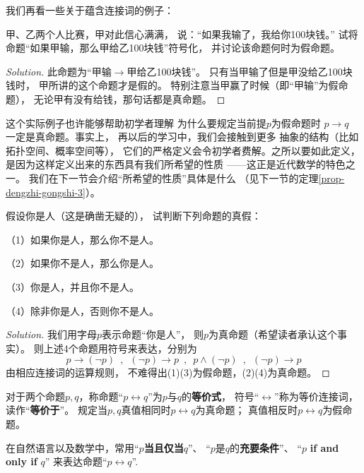 我们再看一些关于蕴含连接词的例子：

\begin{example}
甲、乙两个人比赛，甲对此信心满满，
说：“如果我输了，我给你100块钱。”
试将命题“如果甲输，那么甲给乙100块钱”符号化，
并讨论该命题何时为假命题。
\end{example}
\begin{proof}[Solution]
此命题为“甲输$\rightarrow$甲给乙100块钱”。
只有当甲输了但是甲没给乙100块钱时，
甲所讲的这个命题才是假的。
特别注意当甲赢了时候（即“甲输”为假命题），
无论甲有没有给钱，那句话都是真命题。
\end{proof}

这个实际例子也许能够帮助初学者理解
为什么要规定当前提$p$为假命题时
$p\rightarrow q$ 一定是真命题。事实上，
再以后的学习中，我们会接触到更多
抽象的结构（比如拓扑空间、概率空间等），
它们的严格定义会令初学者费解。之所以要如此定义，
是因为这样定义出来的东西具有我们所希望的性质
——这正是近代数学的特色之一。
我们在下一节会介绍“所希望的性质”具体是什么
（见下一节的定理\ref{prop-dengzhi-gongshi-3}）。

\begin{example}假设你是人（这是确凿无疑的），
试判断下列命题的真假：

（1）如果你是人，那么你不是人。

（2）如果你不是人，那么你是人。

（3）你是人，并且你不是人。

（4）除非你是人，否则你不是人。
\end{example}

\begin{proof}[Solution]
我们用字母$p$表示命题“你是人”，
则$p$为真命题（希望读者承认这个事实）。
则上述4个命题用符号来表达，分别为
$$p\rightarrow (\neg p)\,\,\,,\,\,\,
(\neg p)\rightarrow p\,\,\,,\,\,\,
p\wedge(\neg p)\,\,\,,\,\,\,
(\neg p)\rightarrow p$$
由相应连接词的运算规则，
不难得出(1)(3)为假命题，(2)(4)为真命题。
\end{proof}

\begin{definition}[等价连接词]
对于两个命题$p,q$，称命题“$p\leftrightarrow q$”为$p$与$q$的\textbf{等价式}，
符号“$\leftrightarrow$”称为等价连接词，读作“\textbf{等价于}”。
规定当$p,q$真值相同时$p\leftrightarrow q$为真命题；
真值相反时$p\leftrightarrow q$为假命题。
\end{definition}
在自然语言以及数学中，常用“$p$\textbf{当且仅当}$q$”、
“$p$是$q$的\textbf{充要条件}”、
“$p$ \textbf{if and only if} $q$”
来表达命题“$p\leftrightarrow q$”.\vsp

